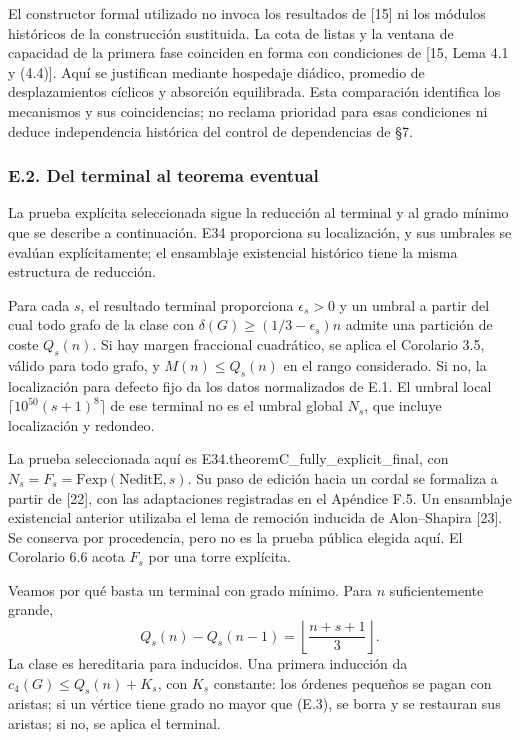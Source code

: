 \documentclass[spanish,11pt,a4paper]{article}
\begin{document}
El constructor formal utilizado no invoca los resultados de {[}15{]} ni los módulos históricos de la construcción sustituida. La cota de listas y la ventana de capacidad de la primera fase coinciden en forma con condiciones de {[}15, Lema 4.1 y (4.4){]}. Aquí se justifican mediante hospedaje diádico, promedio de desplazamientos cíclicos y absorción equilibrada. Esta comparación identifica los mecanismos y sus coincidencias; no reclama prioridad para esas condiciones ni deduce independencia histórica del control de dependencias de §7.

\subsubsection{E.2. Del terminal al teorema eventual}\label{e.2.-del-terminal-al-teorema-eventual}

La prueba explícita seleccionada sigue la reducción al terminal y al grado mínimo que se describe a continuación. E34 proporciona su localización, y sus umbrales se evalúan explícitamente; el ensamblaje existencial histórico tiene la misma estructura de reducción.

Para cada \(s\), el resultado terminal proporciona \(\epsilon_s>0\) y un umbral a partir del cual todo grafo de la clase con \(\delta(G)\ge(1/3-\epsilon_s)n\) admite una partición de coste \(Q_s(n)\). Si hay margen fraccional cuadrático, se aplica el Corolario 3.5, válido para todo grafo, y \(M(n)\le Q_s(n)\) en el rango considerado. Si no, la localización para defecto fijo da los datos normalizados de E.1. El umbral local \(\lceil10^{50}(s+1)^8\rceil\) de ese terminal no es el umbral global \(N_s\), que incluye localización y redondeo.

La prueba seleccionada aquí es {\ttfamily\small E34.\discretionary{\hbox{\ensuremath{\hookrightarrow}}}{}{}theoremC\_\discretionary{\hbox{\ensuremath{\hookrightarrow}}}{}{}fully\_\discretionary{\hbox{\ensuremath{\hookrightarrow}}}{}{}explicit\_\discretionary{\hbox{\ensuremath{\hookrightarrow}}}{}{}final}, con \(N_s=F_s=\mathrm{Fexp}(\mathrm{NeditE},s)\). Su paso de edición hacia un cordal se formaliza a partir de {[}22{]}, con las adaptaciones registradas en el Apéndice F.5. Un ensamblaje existencial anterior utilizaba el lema de remoción inducida de Alon--Shapira {[}23{]}. Se conserva por procedencia, pero no es la prueba pública elegida aquí. El Corolario 6.6 acota \(F_s\) por una torre explícita.

Veamos por qué basta un terminal con grado mínimo. Para \(n\) suficientemente grande, \[
Q_s(n)-Q_s(n-1)=\left\lfloor\frac{n+s+1}{3}\right\rfloor.
\tag{E.3}
\] La clase es hereditaria para inducidos. Una primera inducción da \(c_4(G)\le Q_s(n)+K_s\), con \(K_s\) constante: los órdenes pequeños se pagan con aristas; si un vértice tiene grado no mayor que (E.3), se borra y se restauran sus aristas; si no, se aplica el terminal.
\end{document}
